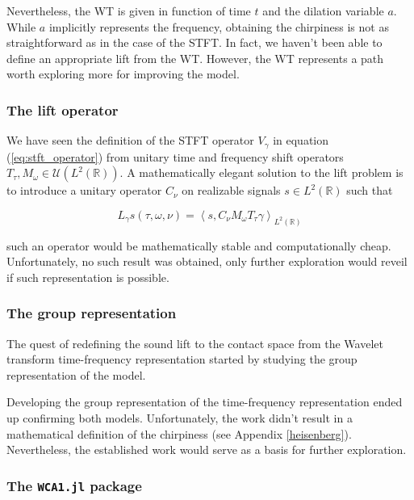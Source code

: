 \documentclass[
  american,
]{article}
\begin{document}
Nevertheless, the WT is given in function of time \(t\) and the dilation variable \(a\).
While \(a\) implicitly represents the frequency, obtaining the chirpiness
is not as straightforward as in the case of the STFT.
In fact, we haven't been able to define an appropriate lift from the WT.
However, the WT represents a path worth exploring more for improving the model.

\hypertarget{the-lift-operator}{%
\subsubsection{The lift operator}\label{the-lift-operator}}

We have seen the definition of the STFT operator \(V_\gamma\) in equation (\ref{eq:stft_operator})
from unitary time and frequency shift operators \(T_\tau,M_\omega\in\mathcal{U}(L^2(\mathbb{R}))\).
A mathematically elegant solution to the lift problem is to introduce
a unitary operator \(C_\nu\) on realizable signals \(s\in L^2(\mathbb{R})\) such that

\begin{equation}
L_\gamma s(\tau,\omega,\nu) = \left\langle s,C_\nu M_\omega T_\tau \gamma\right\rangle_{L^2(\mathbb{R})}
\end{equation}

such an operator would be mathematically stable and computationally cheap.
Unfortunately, no such result was obtained, only further exploration
would reveil if such representation is possible.

\hypertarget{the-group-representation}{%
\subsubsection{The group representation}\label{the-group-representation}}

The quest of redefining the sound lift to the contact space from the Wavelet
transform time-frequency representation started by studying the group representation of the model.

Developing the group representation of the time-frequency representation ended up
confirming both models.
Unfortunately, the work didn't result in a mathematical definition of the chirpiness
(see Appendix \ref{heisenberg}).
Nevertheless, the established work would serve as a basis for further exploration.

\hypertarget{the-wca1.jl-package}{%
\subsubsection{\texorpdfstring{The \texttt{WCA1.jl} package}{The WCA1.jl package}}\label{the-wca1.jl-package}}
\end{document}
